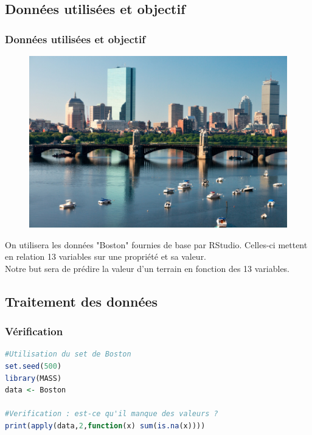 \documentclass[compress]{beamer}
\begin{document}
		\subsection{Données utilisées et objectif}
		\begin{frame}
			\frametitle{Données utilisées et objectif}
			\begin{figure}
				\vspace{-2em}
				\includegraphics[width=\linewidth]{img/boston}
			\end{figure}
			On utilisera les données "Boston" fournies de base par RStudio. Celles-ci mettent en relation 13 variables sur une propriété et sa valeur.
			\\
			Notre but sera de prédire la valeur d'un terrain en fonction des 13 variables.
		\end{frame}
		
			
		\subsection{Traitement des données}

\begin{frame}[fragile]
\frametitle{Vérification}
\begin{lstlisting}[language=R]
#Utilisation du set de Boston
set.seed(500)
library(MASS)
data <- Boston
				
#Verification : est-ce qu'il manque des valeurs ?
print(apply(data,2,function(x) sum(is.na(x))))
\end{lstlisting}				
\end{frame}
\end{document}
